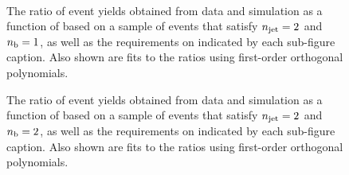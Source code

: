 \begin{figure}[h!]
\begin{center}
    \\
    \caption{The ratio of event yields obtained from data and simulation as a function of \mht [GeV] based on a sample of \mj events that satisfy $n_{\text{jet}} = 2$ and $n_{\text{b}} = 1$, as well as the requirements on \scalht indicated by each sub-figure caption. Also shown are fits to the ratios using first-order orthogonal polynomials.}
    \label{fig:mhtval_Mu_eq2j_eq1b}
  \end{center}
\end{figure}

\begin{figure}[h!]
  \begin{center}
    \caption{The ratio of event yields obtained from data and simulation as a function of \mht [GeV] based on a sample of \mj events that satisfy $n_{\text{jet}} = 2$ and $n_{\text{b}} = 2$, as well as the requirements on \scalht indicated by each sub-figure caption. Also shown are fits to the ratios using first-order orthogonal polynomials.}
    \label{fig:mhtval_Mu_eq2j_eq2b}
  \end{center}
\end{figure}

